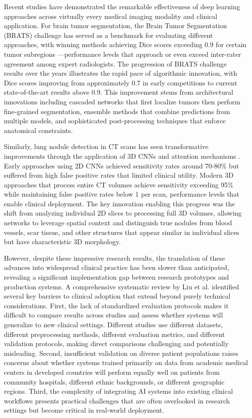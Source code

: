 \documentclass[12pt,a4paper]{article}
\begin{document}
Recent studies have demonstrated the remarkable effectiveness of deep learning approaches across virtually every medical imaging modality and clinical application. For brain tumor segmentation, the Brain Tumor Segmentation (BRATS) challenge has served as a benchmark for evaluating different approaches, with winning methods achieving Dice scores exceeding 0.9 for certain tumor subregions \cite{bakas2018advancing}—performance levels that approach or even exceed inter-rater agreement among expert radiologists. The progression of BRATS challenge results over the years illustrates the rapid pace of algorithmic innovation, with Dice scores improving from approximately 0.7 in early competitions to current state-of-the-art results above 0.9. This improvement stems from architectural innovations including cascaded networks that first localize tumors then perform fine-grained segmentation, ensemble methods that combine predictions from multiple models, and sophisticated post-processing techniques that enforce anatomical constraints.

Similarly, lung nodule detection in CT scans has seen transformative improvements through the application of 3D CNNs and attention mechanisms \cite{setio2017validation}. Early approaches using 2D CNNs achieved sensitivity rates around 70-80\% but suffered from high false positive rates that limited clinical utility. Modern 3D approaches that process entire CT volumes achieve sensitivity exceeding 95\% while maintaining false positive rates below 1 per scan, performance levels that enable clinical deployment. The key innovation enabling this progress was the shift from analyzing individual 2D slices to processing full 3D volumes, allowing networks to leverage spatial context and distinguish true nodules from blood vessels, scar tissue, and other structures that appear similar in individual slices but have characteristic 3D morphology.

However, despite these impressive research results, the translation of these advances into widespread clinical practice has been slower than anticipated, revealing a significant implementation gap between research prototypes and production systems. A comprehensive systematic review by Liu et al. \cite{liu2019comparison} identified several key barriers to clinical adoption that extend beyond purely technical considerations. First, the lack of standardized evaluation protocols makes it difficult to compare results across studies and assess whether systems will generalize to new clinical settings. Different studies use different datasets, different preprocessing methods, different evaluation metrics, and different validation protocols, making direct comparisons challenging and potentially misleading. Second, insufficient validation on diverse patient populations raises concerns about whether systems trained primarily on data from academic medical centers in developed countries will perform equally well on patients from community hospitals, different ethnic backgrounds, or different geographic regions. Third, the complexity of integrating AI systems into existing clinical workflows presents practical challenges that are often overlooked in research settings but become critical in real-world deployment.
\end{document}
